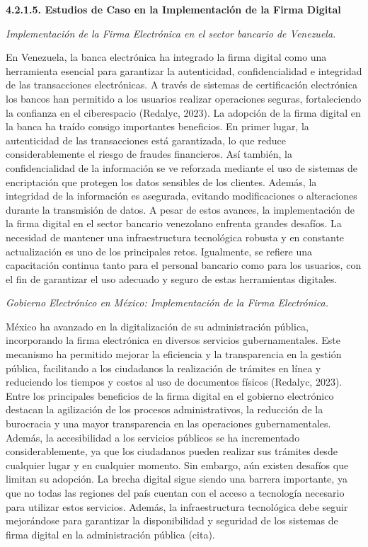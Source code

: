 \documentclass{amsart}
\begin{document}
    
    \textbf{ 4.2.1.5. Estudios de Caso en la Implementación de la Firma Digital }
    
    
    \textit{ Implementación de la Firma Electrónica en el sector bancario de Venezuela. }
    
    En Venezuela, la banca electrónica ha integrado la firma digital como una herramienta esencial para garantizar la autenticidad, confidencialidad e integridad de las transacciones electrónicas. A través de sistemas de certificación electrónica los bancos han permitido a los usuarios realizar operaciones seguras, fortaleciendo la confianza en el ciberespacio (Redalyc, 2023).
    La adopción de la firma digital en la banca ha traído consigo importantes beneficios. En primer lugar, la autenticidad de las transacciones está garantizada, lo que reduce considerablemente el riesgo de fraudes financieros. Así también, la confidencialidad de la información se ve reforzada mediante el uso de sistemas de encriptación que protegen los datos sensibles de los clientes. Además, la integridad de la información es asegurada, evitando modificaciones o alteraciones durante la transmisión de datos.
    A pesar de estos avances, la implementación de la firma digital en el sector bancario venezolano enfrenta grandes desafíos. La necesidad de mantener una infraestructura tecnológica robusta y en constante actualización es uno de los principales retos. Igualmente, se refiere una capacitación continua tanto para el personal bancario como para los usuarios, con el fin de garantizar el uso adecuado y seguro de estas herramientas digitales.

    
    \textit{ Gobierno Electrónico en México: Implementación de la Firma Electrónica. }
    
    México ha avanzado en la digitalización de su administración pública, incorporando la firma electrónica en diversos servicios gubernamentales. Este mecanismo ha permitido mejorar la eficiencia y la transparencia en la gestión pública, facilitando a los ciudadanos la realización de trámites en línea y reduciendo los tiempos y costos al uso de documentos físicos (Redalyc, 2023).
    Entre los principales beneficios de la firma digital en el gobierno electrónico destacan la agilización de los procesos administrativos, la reducción de la burocracia y una mayor transparencia en las operaciones gubernamentales. Además, la accesibilidad a los servicios públicos se ha incrementado considerablemente, ya que los ciudadanos pueden realizar sus trámites desde cualquier lugar y en cualquier momento.
    Sin embargo, aún existen desafíos que limitan su adopción. La brecha digital sigue siendo una barrera importante, ya que no todas las regiones del país cuentan con el acceso a tecnología necesario para utilizar estos servicios. Además, la infraestructura tecnológica debe seguir mejorándose para garantizar la disponibilidad y seguridad de los sistemas de firma digital en la administración pública (cita).
\end{document}
